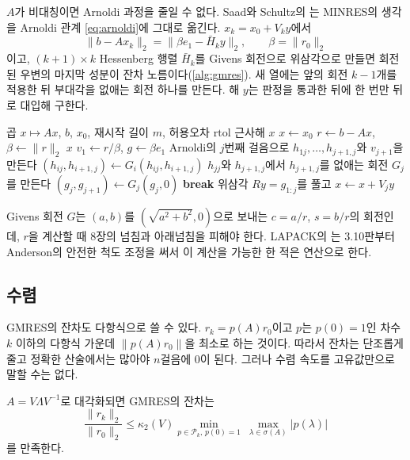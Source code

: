 $A$가 비대칭이면 Arnoldi 과정을 줄일 수 없다. Saad와 Schultz의 는 MINRES의 생각을 Arnoldi 관계 \eqref{eq:arnoldi}에 그대로 옮긴다\cite{saad1986gmres}. $x_k=x_0+V_ky$에서
\[
\|b-Ax_k\|_2=\|\beta e_1-\bar H_ky\|_2,\qquad\beta=\|r_0\|_2
\]
이고, $(k+1)\times k$ Hessenberg 행렬 $\bar H_k$를 Givens 회전으로 위삼각으로 만들면 회전된 우변의 마지막 성분이 잔차 노름이다(\cref{alg:gmres}). 새 열에는 앞의 회전 $k-1$개를 적용한 뒤 부대각을 없애는 회전 하나를 만든다. 해 $y$는 판정을 통과한 뒤에 한 번만 뒤로 대입해 구한다.

\begin{algorithm}[t]
\begin{algorithmic}[1]
\Require 곱 $x\mapsto Ax$, $b$, $x_0$, 재시작 길이 $m$, 허용오차 $\mathrm{rtol}$
\Ensure 근사해 $x$
\State $x\gets x_0$
\Loop
  \State $r\gets b-Ax$, $\beta\gets\|r\|_2$
   \Return $x$
  \EndIf
  \State $v_1\gets r/\beta$, $g\gets\beta e_1$
    \State Arnoldi의 $j$번째 걸음으로 $h_{1j},\dots,h_{j+1,j}$와 $v_{j+1}$을 만든다
      \State $(h_{ij},h_{i+1,j})\gets G_i(h_{ij},h_{i+1,j})$ 
    \EndFor
    \State $h_{jj}$와 $h_{j+1,j}$에서 $h_{j+1,j}$를 없애는 회전 $G_j$를 만든다
    \State $(g_j,g_{j+1})\gets G_j(g_j,0)$ 
     \textbf{break}
    \EndIf
  \EndFor
  \State 위삼각 $R y=g_{1:j}$를 풀고 $x\gets x+V_jy$
\EndLoop
\end{algorithmic}
\caption{재시작 GMRES($m$)}
\label{alg:gmres}
\end{algorithm}

Givens 회전 $G$는 $(a,b)$를 $(\sqrt{a^2+b^2},0)$으로 보내는 $c=a/r$, $s=b/r$의 회전인데, $r$을 계산할 때 8장의 넘침과 아래넘침을 피해야 한다. LAPACK의 는 3.10판부터 Anderson의 안전한 척도 조정을 써서 이 계산을 가능한 한 적은 연산으로 한다\cite{anderson2017safe}.

\subsection{수렴}

GMRES의 잔차도 다항식으로 쓸 수 있다. $r_k=p(A)r_0$이고 $p$는 $p(0)=1$인 차수 $k$ 이하의 다항식 가운데 $\|p(A)r_0\|$을 최소로 하는 것이다. 따라서 잔차는 단조롭게 줄고 정확한 산술에서는 많아야 $n$걸음에 $0$이 된다. 그러나 수렴 속도를 고유값만으로 말할 수는 없다.

\begin{theorem}
\label{thm:gmres-diag}
$A=V\Lambda V^{-1}$로 대각화되면 GMRES의 잔차는
\[
\frac{\|r_k\|_2}{\|r_0\|_2}\le\kappa_2(V)\min_{p\in\mathcal P_k,\,p(0)=1}\ \max_{\lambda\in\sigma(A)}|p(\lambda)|
\]
를 만족한다.
\end{theorem}


